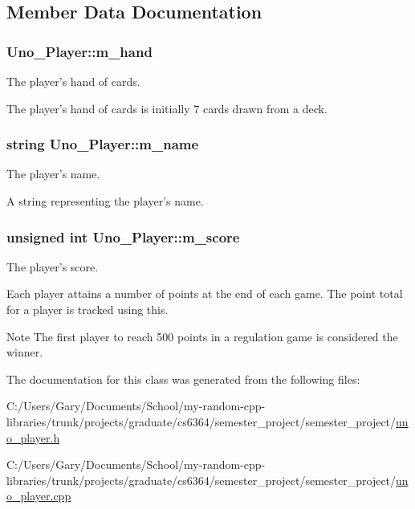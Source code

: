 \subsection{\-Member \-Data \-Documentation}
\hypertarget{class_uno___player_a9d50084b9fd4b005286ffdaa004f2664}{
\subsubsection[{m\-\_\-hand}]{ {\bf \-Uno\-\_\-\-Player\-::m\-\_\-hand}}}
\label{class_uno___player_a9d50084b9fd4b005286ffdaa004f2664}


\-The player's hand of cards. 

\-The player's hand of cards is initially 7 cards drawn from a deck. \hypertarget{class_uno___player_a06af109b4d621efa14ba98e4c9395739}{
\subsubsection[{m\-\_\-name}]{\setlength{\rightskip}{0pt plus 5cm}string {\bf \-Uno\-\_\-\-Player\-::m\-\_\-name}}}
\label{class_uno___player_a06af109b4d621efa14ba98e4c9395739}


\-The player's name. 

\-A string representing the player's name. \hypertarget{class_uno___player_a9805f306a500b1898c0a0922d76de444}{
\subsubsection[{m\-\_\-score}]{\setlength{\rightskip}{0pt plus 5cm}unsigned int {\bf \-Uno\-\_\-\-Player\-::m\-\_\-score}}}
\label{class_uno___player_a9805f306a500b1898c0a0922d76de444}


\-The player's score. 

\-Each player attains a number of points at the end of each game. \-The point total for a player is tracked using this. \begin{DoxyNote}{\-Note}
\-The first player to reach 500 points in a regulation game is considered the winner. 
\end{DoxyNote}


\-The documentation for this class was generated from the following files\-:\begin{DoxyCompactItemize}
\item 
\-C\-:/\-Users/\-Gary/\-Documents/\-School/my-\/random-\/cpp-\/libraries/trunk/projects/graduate/cs6364/semester\-\_\-project/semester\-\_\-project/\hyperlink{uno__player_8h}{uno\-\_\-player.\-h}\item 
\-C\-:/\-Users/\-Gary/\-Documents/\-School/my-\/random-\/cpp-\/libraries/trunk/projects/graduate/cs6364/semester\-\_\-project/semester\-\_\-project/\hyperlink{uno__player_8cpp}{uno\-\_\-player.\-cpp}\end{DoxyCompactItemize}
